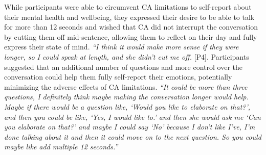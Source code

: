         While participants were able to circumvent \ac{CA} limitations to self-report about their mental health and wellbeing, they expressed their desire to be able to talk for more than 12 seconds and wished that \ac{CA} did not interrupt the conversation by cutting them off mid-sentence, allowing them to reflect on their day and fully express their state of mind.
                \textit{
                ``I think it would make more sense if they were longer, so I could speak at length, and she didn't cut me off.
                }
                [P4].
        Participants suggested that an additional number of questions and more control over the conversation could help them fully self-report their emotions, potentially minimizing the adverse effects of \ac{CA} limitations. 
                \textit{
                ``It could be more than three questions, 
                I definitely think maybe making the conversation longer would help. 
                Maybe if there would be a question like, `Would you like to elaborate on that?', and then you could be like, `Yes, I would like to.' and then she would ask me `Can you elaborate on that?' and maybe I could say `No' because I don't like I've, I'm done talking about it and then it could move on to the next question.
                So you could maybe like add multiple 12 seconds.''
                }
